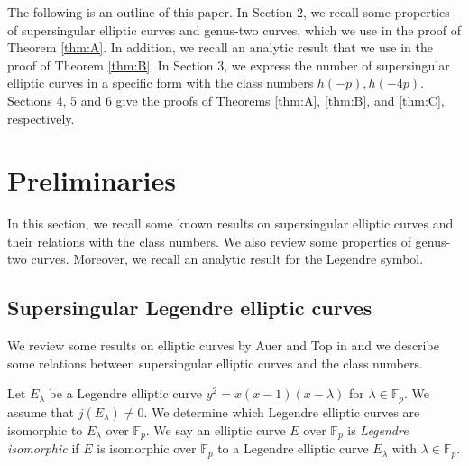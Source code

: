 \documentclass[10pt,a4paper]{amsart}
\theoremstyle{plain}
\newcommand{\lm}{\lambda}
\newcommand{\fp}{\mathbb{F}_p}
\begin{document}
The following is an outline of this paper. In Section 2, we recall some properties of supersingular elliptic curves and genus-two curves, which we use in the proof of Theorem \ref{thm:A}. In addition, we recall an analytic result that we use in the proof of Theorem \ref{thm:B}. In Section 3, we express the number of supersingular elliptic curves in a specific form with the class numbers $h(-p),h(-4p)$. Sections 4, 5 and 6 give the proofs of Theorems \ref{thm:A}, \ref{thm:B}, and \ref{thm:C}, respectively. 


\section{Preliminaries}
In this section, we recall some known results on supersingular elliptic curves and  their relations with the class numbers. We also review some properties of genus-two curves. Moreover, we recall an analytic result for the Legendre symbol.
  \subsection{Supersingular Legendre elliptic curves}\label{subsec:2.1}
  We review some results on elliptic curves by Auer and Top in \cite{AT02} and we describe some relations between supersingular elliptic curves and the class numbers.

  Let $E_{\lm}$ %
  be a Legendre elliptic curve $y^2=x(x-1)(x-\lm)$ for $\lambda\in\fp$.
  We assume that $j(E_{\lm}) \ne 0$.
  We determine which Legendre elliptic curves are isomorphic to $E_{\lm}$ over $\fp$. 
  We say an elliptic curve $E$ over $\fp$ is \textit{Legendre isomorphic} if $E$ is isomorphic over $\fp$ to a Legendre elliptic curve $E_{\lm}$ with $\lm \in \fp$. %
 
\end{document}
